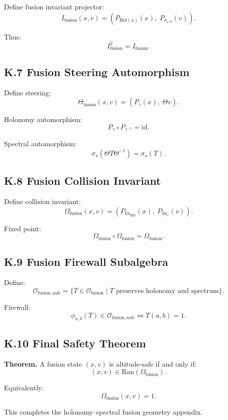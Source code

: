 Define fusion invariant projector:
\[
I_{\mathrm{fusion}}(x,v) =
(P_{\mathrm{Hol}(x)}(x),\; P_{\sigma_{\star,0}}(v)).
\]

Thus:
\[
I_{\mathrm{fusion}}^2 = I_{\mathrm{fusion}}.
\]

\subsection*{K.7 Fusion Steering Automorphism}

Define steering:
\[
\Theta_{\mathrm{fusion}}(x,v) =
(P_{\gamma}(x),\; \Theta v).
\]

Holonomy automorphism:
\[
P_{\gamma} \circ P_{\gamma^{-1}} = \mathrm{id}.
\]

Spectral automorphism:
\[
\sigma_{\star}(\Theta T \Theta^{-1}) = \sigma_{\star}(T).
\]

\subsection*{K.8 Fusion Collision Invariant}

Define collision invariant:
\[
\Omega_{\mathrm{fusion}}(x,v) =
(P_{\mathrm{fix}_{\mathrm{Hol}}}(x),\;
P_{\mathrm{fix}_{\star}}(v)).
\]

Fixed point:
\[
\Omega_{\mathrm{fusion}} \circ \Omega_{\mathrm{fusion}}
= \Omega_{\mathrm{fusion}}.
\]

\subsection*{K.9 Fusion Firewall Subalgebra}

Define:
\[
\mathcal{O}_{\mathrm{fusion,safe}} =
\{ T \in \mathcal{O}_{\mathrm{fusion}} \mid
T \text{ preserves holonomy and spectrum} \}.
\]

Firewall:
\[
\phi_{a,b}(T) \in \mathcal{O}_{\mathrm{fusion,safe}}
\iff
T(a,b)=1.
\]

\subsection*{K.10 Final Safety Theorem}

\textbf{Theorem.}  
A fusion state $(x,v)$ is altitude-safe if and only if:
\[
(x,v) \in \mathrm{Ran}(\Omega_{\mathrm{fusion}}).
\]

Equivalently:
\[
\Omega_{\mathrm{fusion}}(x,v)=1.
\]

This completes the holonomy–spectral fusion geometry appendix.
